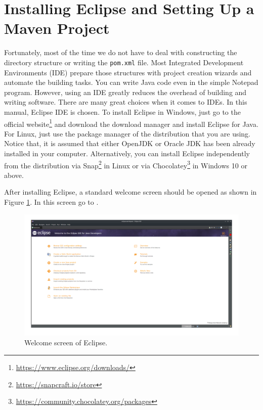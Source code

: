 \section{Installing Eclipse and Setting Up a Maven Project}
Fortunately, most of the time we do not have to deal with constructing the directory structure or writing the \verb|pom.xml| file. Most Integrated Development Environments (IDE) prepare those structures with project creation wizards and automate the building tasks. You can write Java code even in the simple Notepad program. However, using an IDE greatly reduces the overhead of building and writing software. There are many great choices when it comes to IDEs. In this manual, Eclipse IDE is chosen. To install Eclipse in Windows, just go to the official website\footnote{\url{https://www.eclipse.org/downloads/}} and download the download manager and install Eclipse for Java. For Linux, just use the package manager of the distribution that you are using. Notice that, it is assumed that either OpenJDK or Oracle JDK has been already installed in your computer. Alternatively, you can install Eclipse independently from the distribution via Snap\footnote{\url{https://snapcraft.io/store}} in Linux or via Chocolatey\footnote{\url{https://community.chocolatey.org/packages}} in Windows 10 or above.

After installing Eclipse, a standard welcome screen should be opened as shown in Figure \ref{fig:eclipse-welcome}. In this screen go to .

\begin{figure}[H]
    \centering
    \includegraphics[width=\textwidth]{images/eclipse-welcome.png}
    \caption{Welcome screen of Eclipse.}
    \label{fig:eclipse-welcome}
\end{figure}

